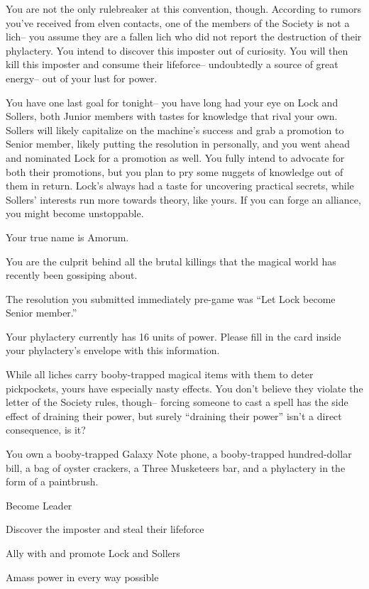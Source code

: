 \documentclass[char]{Sel}
\begin{document}
You are not the only rulebreaker at this convention, though. According to rumors you've received from elven contacts, one of the members of the Society is not a lich-- you assume they are a fallen lich who did not report the destruction of their phylactery. You intend to discover this imposter out of curiosity. You will then kill this imposter and consume their lifeforce-- undoubtedly a source of great energy-- out of your lust for power.

You have one last goal for tonight-- you have long had your eye on Lock and Sollers, both Junior members with tastes for knowledge that rival your own. Sollers will likely capitalize on the machine's success and grab a promotion to Senior member, likely putting the resolution in personally, and you went ahead and nominated Lock for a promotion as well. You fully intend to advocate for both their promotions, but you plan to pry some nuggets of knowledge out of them in return. Lock's always had a taste for uncovering practical secrets, while Sollers' interests run more towards theory, like yours. If you can forge an alliance, you might become unstoppable.

\begin{itemz}[Notes]
  \item Your true name is Amorum.
    \item You are the culprit behind all the brutal killings that the magical world has recently been gossiping about.
  \item The resolution you submitted immediately pre-game was ``Let Lock become Senior member.''
      \item Your phylactery currently has 16 units of power. Please fill in the card inside your phylactery's envelope with this information.
   \item While all liches carry booby-trapped magical items with them to deter pickpockets, yours have especially nasty effects. You don't believe they violate the letter of the Society rules, though-- forcing someone to cast a spell has the side effect of draining their power, but surely ``draining their power'' isn't a direct consequence, is it?
\item You own a booby-trapped Galaxy Note phone, a booby-trapped hundred-dollar bill, a bag of oyster crackers, a Three Musketeers bar, and a phylactery in the form of a paintbrush.
    \end{itemz}
   
    
 \begin{itemz}[Goals]
\item Become Leader
\item Discover the imposter and steal their lifeforce
\item Ally with and promote Lock and Sollers
\item Amass power in every way possible
\end{itemz}
\end{document}
